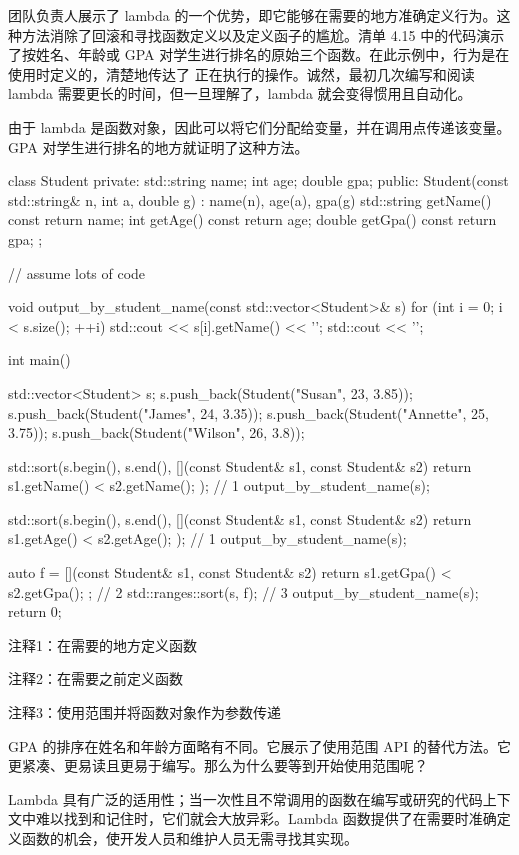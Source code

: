 团队负责人展示了 lambda 的一个优势，即它能够在需要的地方准确定义行为。这种方法消除了回滚和寻找函数定义以及定义函子的尴尬。清单 4.15 中的代码演示了按姓名、年龄或 GPA 对学生进行排名的原始三个函数。在此示例中，行为是在使用时定义的，清楚地传达了 正在执行的操作。诚然，最初几次编写和阅读 lambda 需要更长的时间，但一旦理解了，lambda 就会变得惯用且自动化。

由于 lambda 是函数对象，因此可以将它们分配给变量，并在调用点传递该变量。GPA 对学生进行排名的地方就证明了这种方法。


\begin{cpp}
class Student {
private:
  std::string name;
  int age;
  double gpa;
public:
  Student(const std::string& n, int a, double g) : name(n), age(a), gpa(g) {}
  std::string getName() const { return name; }
  int getAge() const { return age; }
  double getGpa() const { return gpa; }
};

// assume lots of code

void output_by_student_name(const std::vector<Student>& s) {
  for (int i = 0; i < s.size(); ++i)
    std::cout << s[i].getName() << '\n';
  std::cout << '\n';
}

int main() {
  std::vector<Student> s;
  s.push_back(Student("Susan", 23, 3.85));
  s.push_back(Student("James", 24, 3.35));
  s.push_back(Student("Annette", 25, 3.75));
  s.push_back(Student("Wilson", 26, 3.8));

  std::sort(s.begin(), s.end(),
    [](const Student& s1, const Student& s2){
      return s1.getName() < s2.getName(); }); // 1
  output_by_student_name(s);

  std::sort(s.begin(), s.end(),
    [](const Student& s1, const Student& s2){
      return s1.getAge() < s2.getAge(); }); // 1
  output_by_student_name(s);

  auto f = [](const Student& s1, const Student& s2) {
    return s1.getGpa() < s2.getGpa(); }; // 2
  std::ranges::sort(s, f); // 3
  output_by_student_name(s);
  return 0;
}
\end{cpp}

{\footnotesize
注释1：在需要的地方定义函数

注释2：在需要之前定义函数

注释3：使用范围并将函数对象作为参数传递
}

GPA 的排序在姓名和年龄方面略有不同。它展示了使用范围 API 的替代方法。它更紧凑、更易读且更易于编写。那么为什么要等到开始使用范围呢？

Lambda 具有广泛的适用性；当一次性且不常调用的函数在编写或研究的代码上下文中难以找到和记住时，它们就会大放异彩。Lambda 函数提供了在需要时准确定义函数的机会，使开发人员和维护人员无需寻找其实现。

